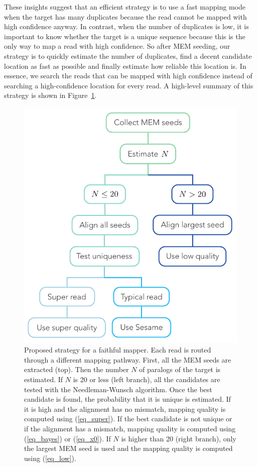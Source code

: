\documentclass[a4,center,fleqn]{NAR}
\begin{document}
These insights suggest that an efficient strategy is to use a fast mapping
mode when the target has many duplicates because the read cannot be mapped
with high confidence anyway. In contrast, when the number of duplicates is
low, it is important to know whether the target is a unique sequence
because this is the only way to map a read with high confidence. So after
MEM seeding, our strategy is to quickly estimate the number of duplicates,
find a decent candidate location as fast as possible and finally estimate
how reliable this location is. In essence, we search the reads that
can be mapped with high confidence instead of searching a high-confidence
location for every read. A high-level summary of this strategy is shown in
Figure~\ref{fig_tree}.

\begin{figure}[t]
\begin{center}
\includegraphics[scale=.8]{decision_tree.pdf}
\end{center}
\caption{Proposed strategy for a faithful mapper. Each read is routed
through a different mapping pathway. First, all the MEM seeds are
extracted (top). Then the number $N$ of paralogs of the target is
estimated. If $N$ is 20 or less (left branch), all the candidates are
tested with the Needleman-Wunsch algorithm. Once the best candidate is
found, the probability that it is unique is estimated. If it is high and
the alignment has no mismatch, mapping quality is computed using
(\ref{eq_super}). If the best candidate is not unique or if the alignment
has a mismatch, mapping quality is computed using (\ref{eq_bayes}) or
(\ref{eq_x0}). If $N$ is higher than 20 (right branch), only the largest
MEM seed is used and the mapping quality is computed using (\ref{eq_low}).
}
\label{fig_tree}
\end{figure}
\end{document}

